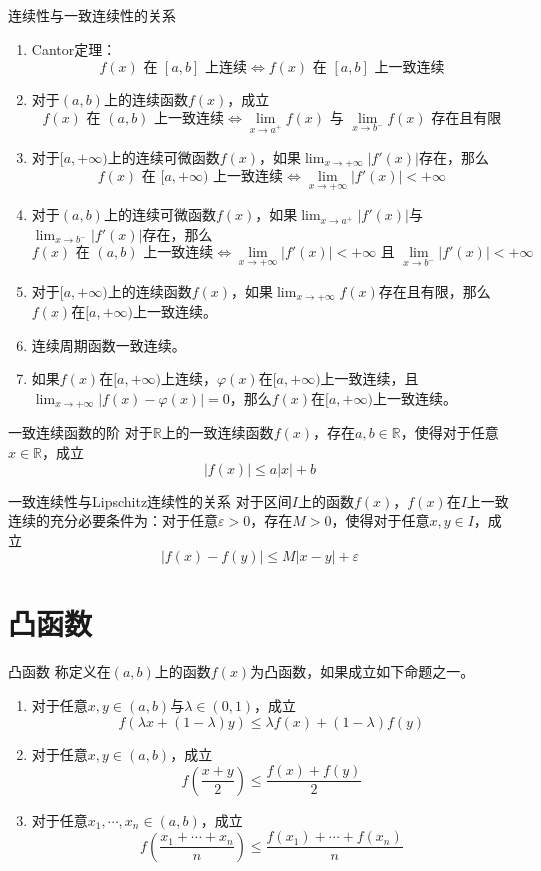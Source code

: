 \documentclass[lang = cn, scheme = chinese, thmcnt = section]{elegantbook}
\newcommand{\R}{\mathbb{R}}            %
\begin{document}
\begin{theorem}{连续性与一致连续性的关系}
	\begin{enumerate}
		\item Cantor定理：
		$$
		f(x)\text{ 在 }[a,b]\text{ 上连续}
		\iff
		f(x)\text{ 在 }[a,b]\text{ 上一致连续}
		$$
		\item 对于$(a,b)$上的连续函数$f(x)$，成立
		$$
		f(x)\text{ 在 }(a,b)\text{ 上一致连续}
		\iff
		\lim_{x\to a^+}f(x)\text{ 与 }\lim_{x\to b^-}f(x)\text{ 存在且有限}
		$$
		\item 对于$[a,+\infty)$上的连续可微函数$f(x)$，如果$\displaystyle\lim_{x\to +\infty}|f'(x)|$存在，那么
		$$
		f(x)\text{ 在 }[a,+\infty)\text{ 上一致连续}
		\iff
		\lim_{x\to +\infty}|f'(x)|<+\infty
		$$
		\item 对于$(a,b)$上的连续可微函数$f(x)$，如果$\displaystyle\lim_{x\to a^+}|f'(x)|$与$\displaystyle\lim_{x\to b^-}|f'(x)|$存在，那么
		$$
		f(x)\text{ 在 }(a,b)\text{ 上一致连续}
		\iff
		\lim_{x\to +\infty}|f'(x)|<+\infty\text{ 且 }
		\lim_{x\to b^-}|f'(x)|<+\infty
		$$
		\item 对于$[a,+\infty)$上的连续函数$f(x)$，如果$\displaystyle\lim_{x\to +\infty}f(x)$存在且有限，那么$f(x)$在$[a,+\infty)$上一致连续。
		\item 连续周期函数一致连续。
		\item 如果$f(x)$在$[a,+\infty)$上连续，$\varphi(x)$在$[a,+\infty)$上一致连续，且$\displaystyle\lim_{x\to +\infty}|f(x)-\varphi(x)|=0$，那么$f(x)$在$[a,+\infty)$上一致连续。
	\end{enumerate}
\end{theorem}

\begin{theorem}{一致连续函数的阶}
	对于$\R$上的一致连续函数$f(x)$，存在$a,b\in\R$，使得对于任意$x\in\R$，成立
	$$
	|f(x)|\le a|x|+b
	$$
\end{theorem}

\begin{theorem}{一致连续性与Lipschitz连续性的关系}
	对于区间$I$上的函数$f(x)$，$f(x)$在$I$上一致连续的充分必要条件为：对于任意$\varepsilon>0$，存在$M>0$，使得对于任意$x,y\in I$，成立
	$$
	|f(x)-f(y)|\le M|x-y|+\varepsilon
	$$
\end{theorem}

\section{凸函数}

\begin{definition}{凸函数}
	称定义在$(a,b)$上的函数$f(x)$为凸函数，如果成立如下命题之一。
	\begin{enumerate}
		\item 对于任意$x,y\in (a,b)$与$\lambda\in (0,1)$，成立
		$$
		f(\lambda x+(1-\lambda )y)\le 
		\lambda f(x)+(1-\lambda )f(y)
		$$
		\item 对于任意$x,y\in (a,b)$，成立
		$$
		f\left(\frac{x+y}{2}\right)
		\le\frac{f(x)+f(y)}{2}
		$$
		\item 对于任意$x_1,\cdots,x_n\in (a,b)$，成立
		$$
		f\left(\frac{x_1+\cdots+x_n}{n}\right)
		\le\frac{f(x_1)+\cdots +f(x_n)}{n}
		$$
	\end{enumerate}
\end{definition}
\end{document}
